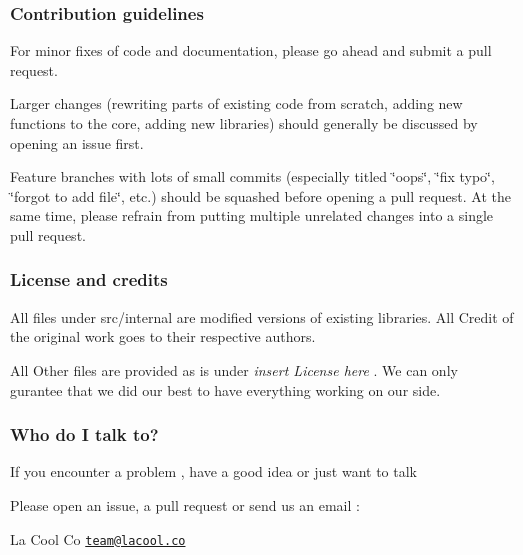 \subsubsection*{Contribution guidelines}

For minor fixes of code and documentation, please go ahead and submit a pull request.

Larger changes (rewriting parts of existing code from scratch, adding new functions to the core, adding new libraries) should generally be discussed by opening an issue first.

Feature branches with lots of small commits (especially titled \char`\"{}oops\char`\"{}, \char`\"{}fix typo\char`\"{}, \char`\"{}forgot to add file\char`\"{}, etc.) should be squashed before opening a pull request. At the same time, please refrain from putting multiple unrelated changes into a single pull request.

\subsubsection*{License and credits}

All files under src/internal are modified versions of existing libraries. All Credit of the original work goes to their respective authors.

All Other files are provided as is under {\itshape insert License here} . We can only gurantee that we did our best to have everything working on our side.

\subsubsection*{Who do I talk to?}

If you encounter a problem , have a good idea or just want to talk

Please open an issue, a pull request or send us an email \+:

La Cool Co \href{mailto:team@lacool.co}{\tt team@lacool.\+co} 